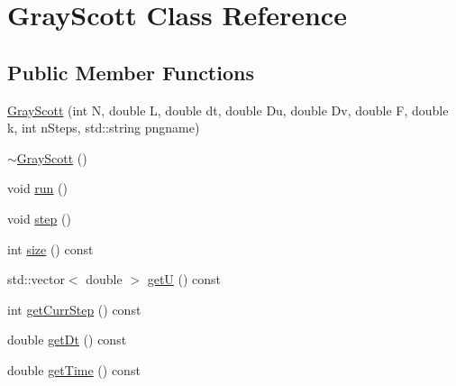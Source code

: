 \hypertarget{classGrayScott}{\section{Gray\-Scott Class Reference}
\label{classGrayScott}
}
\subsection*{Public Member Functions}
\begin{DoxyCompactItemize}
\item 
\hyperlink{classGrayScott_accea127aa0001c35c226a59112b612b2}{Gray\-Scott} (int N, double L, double dt, double Du, double Dv, double F, double k, int n\-Steps, std\-::string pngname)
\item 
\hyperlink{classGrayScott_a0a745a867985c39e3df22de89a0292d0}{$\sim$\-Gray\-Scott} ()
\item 
void \hyperlink{classGrayScott_adf11a6024de7c77b1e1aae00fa78d174}{run} ()
\item 
void \hyperlink{classGrayScott_a60239e744d4cf6c74fc2af1c45abd8ce}{step} ()
\item 
int \hyperlink{classGrayScott_a1925a03a32d117d3163e633c57703bcf}{size} () const 
\item 
std\-::vector$<$ double $>$ \hyperlink{classGrayScott_a0704c788a8cdf28a49c0d21ef4ecfda1}{get\-U} () const 
\item 
int \hyperlink{classGrayScott_adbff28843549d47f8b3cda66f3915564}{get\-Curr\-Step} () const 
\item 
double \hyperlink{classGrayScott_a000f333075534d13d605cb062089aadb}{get\-Dt} () const 
\item 
double \hyperlink{classGrayScott_a1cd54e9f326da74408e4acff2e6e0ae5}{get\-Time} () const 
\end{DoxyCompactItemize}


